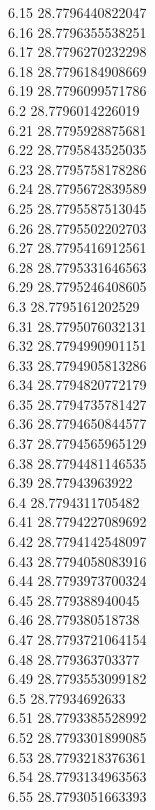 {6.15	28.7796440822047\\
6.16	28.7796355538251\\
6.17	28.7796270232298\\
6.18	28.7796184908669\\
6.19	28.7796099571786\\
6.2	28.7796014226019\\
6.21	28.7795928875681\\
6.22	28.7795843525035\\
6.23	28.7795758178286\\
6.24	28.7795672839589\\
6.25	28.7795587513045\\
6.26	28.7795502202703\\
6.27	28.7795416912561\\
6.28	28.7795331646563\\
6.29	28.7795246408605\\
6.3	28.7795161202529\\
6.31	28.7795076032131\\
6.32	28.7794990901151\\
6.33	28.7794905813286\\
6.34	28.7794820772179\\
6.35	28.7794735781427\\
6.36	28.7794650844577\\
6.37	28.7794565965129\\
6.38	28.7794481146535\\
6.39	28.77943963922\\
6.4	28.7794311705482\\
6.41	28.7794227089692\\
6.42	28.7794142548097\\
6.43	28.7794058083916\\
6.44	28.7793973700324\\
6.45	28.779388940045\\
6.46	28.779380518738\\
6.47	28.7793721064154\\
6.48	28.779363703377\\
6.49	28.7793553099182\\
6.5	28.77934692633\\
6.51	28.7793385528992\\
6.52	28.7793301899085\\
6.53	28.7793218376361\\
6.54	28.7793134963563\\
6.55	28.7793051663393\\
}
